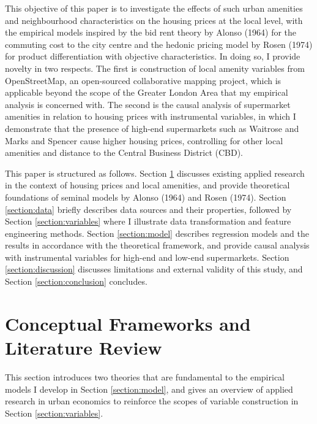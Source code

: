 \documentclass{article}
\begin{document}
This objective of this paper is to investigate the effects of such urban amenities and neighbourhood characteristics on the housing prices at the local level, with the empirical models inspired by the bid rent theory by Alonso (1964) for the commuting cost to the city centre and the hedonic pricing model by Rosen (1974) for product differentiation with objective characteristics. In doing so, I provide novelty in two respects. The first is construction of local amenity variables from OpenStreetMap, an open-sourced collaborative mapping project, which is applicable beyond the scope of the Greater London Area that my empirical analysis is concerned with. The second is the causal analysis of supermarket amenities in relation to housing prices with instrumental variables, in which I demonstrate that the presence of high-end supermarkets such as Waitrose and Marks and Spencer cause higher housing prices, controlling for other local amenities and distance to the Central Business District (CBD).

This paper is structured as follows. Section \ref{section:lit} discusses existing applied research in the context of housing prices and local amenities, and provide theoretical foundations of seminal models by Alonso (1964) and Rosen (1974). Section \ref{section:data} briefly describes data sources and their properties, followed by Section \ref{section:variables} where I illustrate data transformation and feature engineering methods. Section \ref{section:model} describes regression models and the results in accordance with the theoretical framework, and provide causal analysis with instrumental variables for high-end and low-end supermarkets. Section \ref{section:discussion} discusses limitations and external validity of this study, and Section \ref{section:conclusion} concludes.


\section{Conceptual Frameworks and Literature Review} \label{section:lit}
This section introduces two theories that are fundamental to the empirical models I develop in Section \ref{section:model}, and gives an overview of applied research in urban economics to reinforce the scopes of variable construction in Section \ref{section:variables}.
\end{document}
